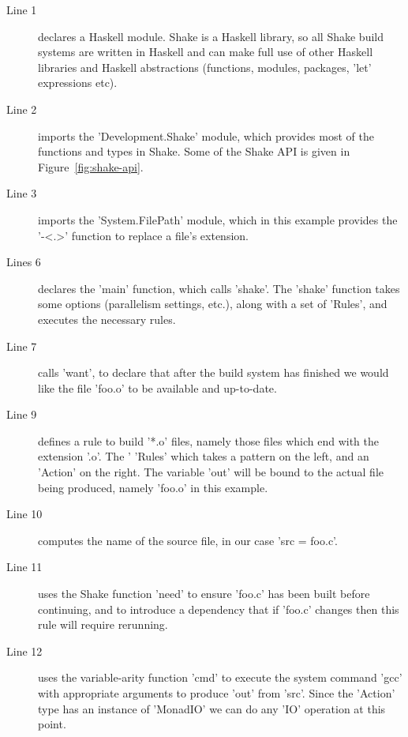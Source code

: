 \begin{description}
\item[Line 1] declares a Haskell module. Shake is a Haskell library, so all
Shake build systems are written in Haskell and can make full use of other
Haskell libraries and Haskell abstractions (functions, modules, packages,
\lst'let' expressions etc).
\item[Line 2] imports the \lst'Development.Shake' module, which provides most of
the functions and types in Shake. Some of the Shake API is given in
Figure~\ref{fig:shake-api}.
\item[Line 3] imports the \lst'System.FilePath' module, which in this example
provides the \lst'-<.>' function to replace a file's extension.
\item[Lines 6] declares the \lst'main' function, which calls \lst'shake'. The
\lst'shake' function takes some options (parallelism settings, etc.), along with
a set of \lst'Rules', and executes the necessary rules.
\item[Line 7] calls \lst'want', to declare that after the build system has
finished we would like the file \lst'foo.o' to be available and up-to-date.
\item[Line 9] defines a rule to build \lst'*.o' files, namely those files which
end with the extension \lst'.o'. The \lst'%
\lst'Rules' which takes a pattern on the left, and an \lst'Action' on the
right. The variable \lst'out' will be bound to the actual file being produced,
namely \lst'foo.o' in this example.
\item[Line 10] computes the name of the source file, in our case \lst'src = foo.c'.
\item[Line 11] uses the Shake function \lst'need' to ensure \lst'foo.c' has been built before
continuing, and to introduce a dependency that if \lst'foo.c' changes then this
rule will require rerunning.
\item[Line 12] uses the variable-arity function \lst'cmd' to execute the system
command \lst'gcc' with appropriate arguments to produce \lst'out' from
\lst'src'. Since the \lst'Action' type has an instance of \lst'MonadIO' we can
do any \lst'IO' operation at this point.
\end{description}

